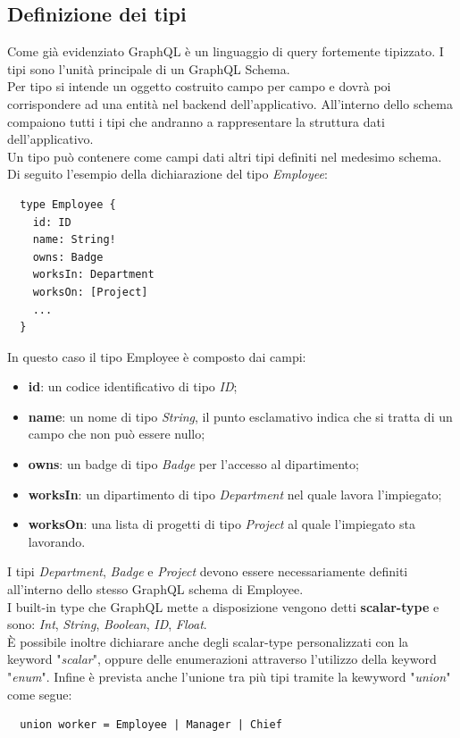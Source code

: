 \subsection{Definizione dei tipi}
Come già evidenziato GraphQL è un linguaggio di query fortemente tipizzato. I tipi sono l'unità principale di un GraphQL Schema.\\
Per tipo si intende un oggetto costruito campo per campo e dovrà poi corrispondere ad una entità nel backend dell'applicativo. All'interno dello schema compaiono tutti i tipi che andranno a rappresentare la struttura dati dell'applicativo.\\
Un tipo può contenere come campi dati altri tipi definiti nel medesimo schema. Di seguito l'esempio della dichiarazione del tipo \textit{Employee}:
\begin{verbatim}
  type Employee {
    id: ID
    name: String!
    owns: Badge
    worksIn: Department
    worksOn: [Project]
    ...
  }
\end{verbatim}
In questo caso il tipo Employee è composto dai campi:
\begin{itemize}
  \item \textbf{id}: un codice identificativo di tipo \textit{ID};
  \item \textbf{name}: un nome di tipo \textit{String}, il punto esclamativo indica che si tratta di un campo che non può essere nullo;
  \item \textbf{owns}: un badge di tipo \textit{Badge} per l'accesso al dipartimento;
  \item \textbf{worksIn}: un dipartimento di tipo \textit{Department} nel quale lavora l'impiegato;
  \item \textbf{worksOn}: una lista di progetti di tipo \textit{Project} al quale l'impiegato sta lavorando.
\end{itemize}
I tipi \textit{Department}, \textit{Badge} e \textit{Project} devono essere necessariamente definiti all'interno dello stesso GraphQL schema di Employee.\\
I built-in type che GraphQL mette a disposizione vengono detti \textbf{scalar-type} e sono: \textit{Int}, \textit{String}, \textit{Boolean}, \textit{ID}, \textit{Float}.\\
È possibile inoltre dichiarare anche degli scalar-type personalizzati con la keyword "\textit{scalar}", oppure delle enumerazioni attraverso l'utilizzo della keyword "\textit{enum}". Infine è prevista anche l'unione tra più tipi tramite la kewyword "\textit{union}" come segue:
\begin{verbatim}
  union worker = Employee | Manager | Chief
\end{verbatim}
